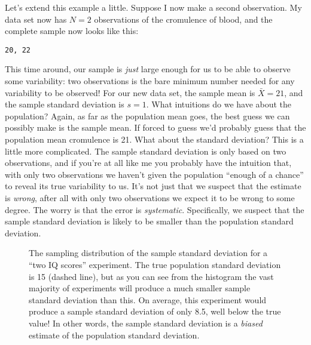 Let's extend this example a little. Suppose I now make a second observation. My data set now has $N=2$ observations of the cromulence of blood, and the complete sample now looks like this:
\begin{center}
\texttt{20, 22}
\end{center}
This time around, our sample is {\it just} large enough for us to be able to observe some variability: two observations is the bare minimum number needed for any variability to be observed! For our new data set, the sample mean is $\bar{X}=21$, and the sample standard deviation is $s=1$. What intuitions do we have about the population? Again, as far as the population mean goes, the best guess we can possibly make is the sample mean. If forced to guess we'd probably guess that the population mean cromulence is 21. What about the standard deviation? This is a little more complicated. The sample standard deviation is only based on two observations, and if you're at all like me you probably have the intuition that, with only two observations we haven't given the population ``enough of a chance'' to reveal its true variability to us. It's not just that we suspect that the estimate is {\it wrong}, after all with only two observations we expect it to be wrong to some degree. The worry is that the error is {\it systematic}. Specifically, we suspect that the sample standard deviation is likely to be smaller than the population standard deviation. 

\begin{figure}[p]
\begin{center}
\caption{The sampling distribution of the sample standard deviation for a ``two IQ scores'' experiment. The true population standard deviation is 15 (dashed line), but as you can see from the histogram the vast majority of experiments will produce a much smaller sample standard deviation than this. On average, this experiment would produce a sample standard deviation of only 8.5, well below the true value! In other words, the sample standard deviation is a {\it biased} estimate of the population standard deviation.}
\label{fig:sampdistsd}
\HR
\end{center}
\end{figure}

